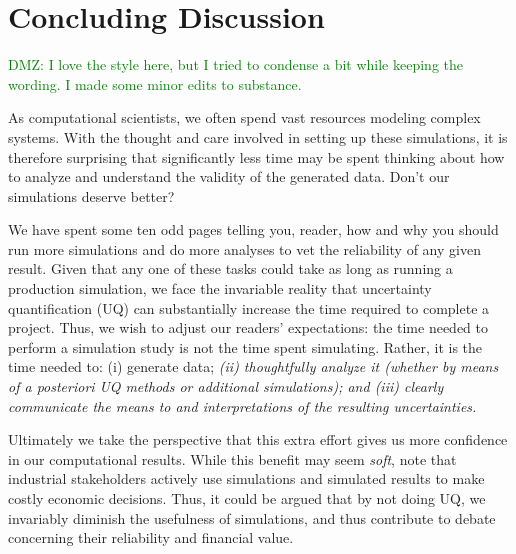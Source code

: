 \section{Concluding Discussion}

\textcolor{green}{DMZ: I love the style here, but I tried to condense a bit while keeping the wording.  I made some minor edits to substance.}

As computational scientists, we often spend vast resources modeling complex systems.  With the thought and care involved in setting up these simulations, it is therefore surprising that  significantly less time may be spent thinking about how to analyze and understand the validity of the generated data.  Don't our simulations deserve better? 

We have spent some ten odd pages telling you, reader, how and why you should run more simulations and do more analyses to vet the reliability of any given result.  Given that any one of these tasks could take as long as running a production simulation, we face the invariable reality that uncertainty quantification (UQ) can substantially increase the time required to complete a project.
Thus, we wish to adjust our readers' expectations: the time needed to perform a simulation study is not the time spent simulating.  Rather, it is the time needed to: (i) generate data; {\it (ii) thoughtfully analyze it (whether by means of a posteriori UQ methods or additional simulations); and (iii) clearly communicate the means to and interpretations of the resulting uncertainties.}


Ultimately we take the perspective that this extra effort gives us more confidence in our computational results.  While this benefit may seem {\it soft}, note that industrial stakeholders actively use simulations and simulated results to make costly economic decisions.  Thus, it could be argued that by not doing UQ, we invariably diminish the usefulness of simulations, and thus contribute to debate concerning their reliability and financial value.

